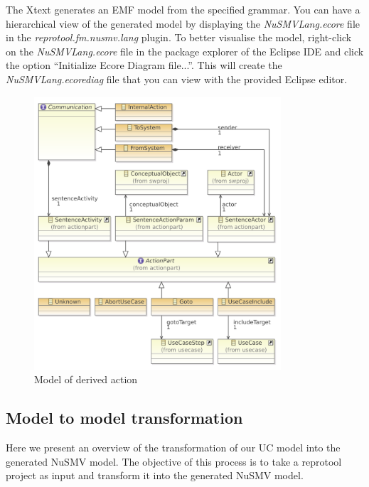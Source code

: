 The Xtext generates an EMF model from the specified grammar. You can have a hierarchical view of the generated model by displaying the
\emph{NuSMVLang.ecore} file in the \emph{reprotool.fm.nusmv.lang} plugin. To better visualise the model, right-click on the \emph{NuSMVLang.ecore} file in
the package explorer of the Eclipse IDE and click the option ``Initialize Ecore Diagram file...''. This will create the \emph{NuSMVLang.ecorediag} file that you can view with the provided Eclipse editor.

\begin{figure}[ht]
  \centering
  \includegraphics[width=260pt]{images/ReprotoolActionsModel}
  \caption{Model of derived action}
  \label{fig:ReprotoolActionsModel}
\end{figure}

\subsection{Model to model transformation}

Here we present an overview of the transformation of our UC model into the generated NuSMV model. The objective of this process is to take a reprotool project as input and transform it into the generated NuSMV model.

